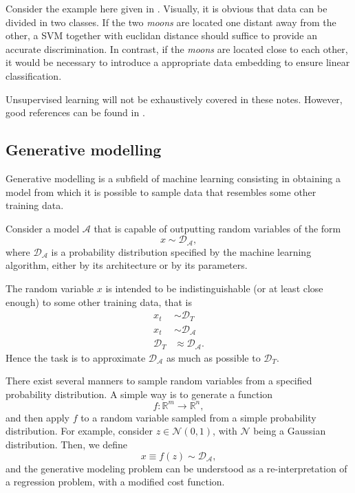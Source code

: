 \documentclass[]{report}
\begin{document}
Consider the example here given in . Visually, it is obvious that data can be divided in two classes. If the two \textit{moons} are located one distant away from the other, a SVM together with euclidan distance should suffice to provide an accurate discrimination. In contrast, if the \textit{moons} are located close to each other, it would be necessary to introduce a appropriate data embedding to ensure linear classification. 



Unsupervised learning will not be exhaustively covered in these notes. However, good references can be found in \cite{pedregosa2011scikitlearn}.

\subsection{Generative modelling}

Generative modelling is a subfield of machine learning consisting in obtaining a model from which it is possible to sample data that resembles some other training data. 

Consider a model $\mathcal A$ that is capable of outputting random variables of the form
\begin{equation}
x \sim \mathcal D_{\mathcal A}, 
\end{equation}
where $\mathcal D_{\mathcal A}$ is a probability distribution specified by the machine learning algorithm, either by its architecture or by its parameters. 

The random variable $x$ is intended to be indistinguishable (or at least close enough) to some other training data, that is
\begin{align}
x_t & \sim \mathcal D_T \\
x_t & \sim \mathcal D_{\mathcal A} \\
\mathcal D_T & \approx \mathcal D_{\mathcal A}.
\end{align}
Hence the task is to approximate $\mathcal D_{\mathcal A}$ as much as possible to $\mathcal D_T$. 

There exist several manners to sample random variables from a specified probability distribution. A simple way is to generate a function 
\begin{equation}
f: \mathbb R^m \rightarrow \mathbb R^n, 
\end{equation}
and then apply $f$ to a random variable sampled from a simple probability distribution. For example, consider $z \in \mathcal N(0, 1)$, with $\mathcal N$ being a Gaussian distribution. Then, we define
\begin{equation}
x \equiv f(z) \sim \mathcal D_{\mathcal A}, 
\end{equation}
and the generative modeling problem can be understood as a re-interpretation of a regression problem, with a modified cost function. 
\end{document}
